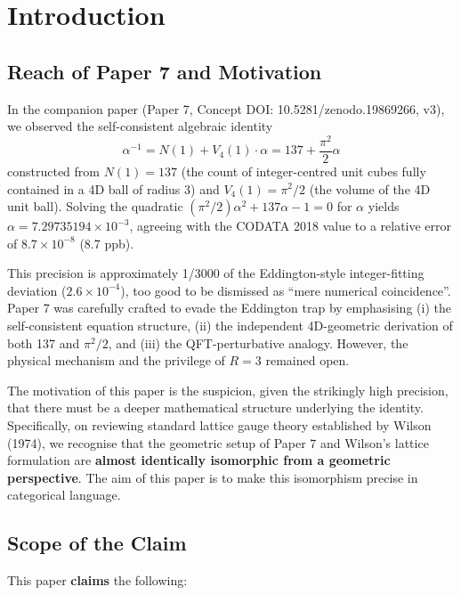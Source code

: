 \documentclass[a4paper,11pt]{article}
\begin{document}
\section{Introduction}

\subsection{Reach of Paper 7 and Motivation}

In the companion paper (Paper 7, Concept DOI: 10.5281/zenodo.19869266, v3), we observed the self-consistent algebraic identity
\begin{equation}
\alpha^{-1} = N(1) + V_4(1) \cdot \alpha = 137 + \frac{\pi^2}{2}\alpha \tag{1.1}
\end{equation}
constructed from $N(1) = 137$ (the count of integer-centred unit cubes fully contained in a 4D ball of radius 3) and $V_4(1) = \pi^2/2$ (the volume of the 4D unit ball). Solving the quadratic $(\pi^2/2)\alpha^2 + 137\alpha - 1 = 0$ for $\alpha$ yields $\alpha = 7.29735194\times 10^{-3}$, agreeing with the CODATA 2018 value to a relative error of $8.7 \times 10^{-8}$ (8.7 ppb).

This precision is approximately 1/3000 of the Eddington-style integer-fitting deviation ($2.6 \times 10^{-4}$), too good to be dismissed as ``mere numerical coincidence''. Paper 7 was carefully crafted to evade the Eddington trap by emphasising (i) the self-consistent equation structure, (ii) the independent 4D-geometric derivation of both 137 and $\pi^2/2$, and (iii) the QFT-perturbative analogy. However, the physical mechanism and the privilege of $R = 3$ remained open.

The motivation of this paper is the suspicion, given the strikingly high precision, that there must be a deeper mathematical structure underlying the identity. Specifically, on reviewing standard lattice gauge theory established by Wilson (1974), we recognise that the geometric setup of Paper 7 and Wilson's lattice formulation are \textbf{almost identically isomorphic from a geometric perspective}. The aim of this paper is to make this isomorphism precise in categorical language.

\subsection{Scope of the Claim}

This paper \textbf{claims} the following:
\end{document}
